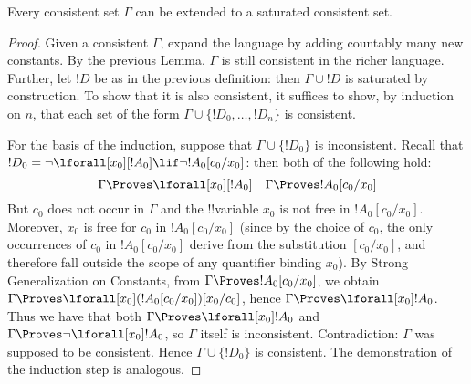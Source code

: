 \documentclass[../../include/open-logic-section]{subfiles}
\begin{document}
\begin{thm}
  Every consistent set $\Gamma$ can be extended to a saturated
  consistent set.
\end{thm}

\begin{proof}
Given a consistent $\Gamma$, expand the language by adding countably
many new constants. By the previous Lemma, $\Gamma$ is still
consistent in the richer language. Further, let $!D$ be as in the
previous definition: then $\Gamma \cup !D$ is saturated by
construction. To show that it is also consistent, it suffices to show,
by induction on $n$, that each set of the form $\Gamma \cup \{
!D_0, \dots, !D_n \}$ is consistent.

For the basis of the induction, suppose that $\Gamma \cup \{ !D_0
\}$ is inconsistent. Recall that $!D_0 = \lnot \lforall[x_0][!A_0]
\lif \lnot !A_0 [c_0/x_0]$: then both of the following hold:
\[
\Gamma \Proves \lforall[x_0][!A_0]
\quad
\Gamma \Proves !A_0[c_0/x_0]
\]
But $c_0$ does not occur in $\Gamma$ and the !!{variable} $x_0$ is not
free in $!A_0 [ c_0/x_0]$. Moreover, $x_0$ is free for $c_0$ in $!A_0
[c_0/x_0]$ (since by the choice of $c_0$, the only occurrences of
$c_0$ in $!A_0 [c_0/x_0]$ derive from the substitution $[c_0/x_0]$,
and therefore fall outside the scope of any quantifier binding
$x_0$). By Strong Generalization on Constants, from $\Gamma \Proves
!A_0 [c_0/x_0]$, we obtain $\Gamma \Proves \lforall[x_0] ( !A_0
[c_0/x_0] ) [x_0/c_0]$, hence $\Gamma \Proves \lforall[x_0]
!A_0$. Thus we have that both $\Gamma \Proves \lforall[x_0] !A_0$ and
$\Gamma \Proves \lnot \lforall[x_0] !A_0$, so $\Gamma$ itself is
inconsistent. Contradiction: $\Gamma$ was supposed to be
consistent. Hence $\Gamma \cup \{ !D_0\}$ is consistent. The
demonstration of the induction step is analogous.
\end{proof}
\end{document}
